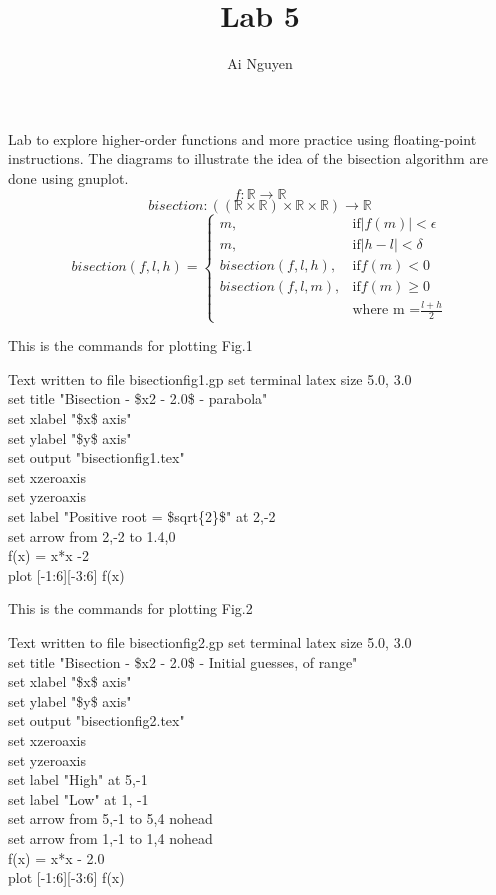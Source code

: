 \documentclass{article}
\begin{document}
\title{Lab 5}
\author{Ai Nguyen}
\maketitle
\clearpage
Lab to explore higher-order functions and more practice using floating-point instructions. The diagrams to illustrate the idea of the bisection algorithm are done using gnuplot. \\
\[ f: \mathbb{R} \rightarrow \mathbb{R} \]
\[ bisection : ((\mathbb{R} \times \mathbb{R}) \times \mathbb{R} \times \mathbb{R}) \rightarrow \mathbb{R}\]
\[ bisection(f,l,h) =
	\begin{cases}
	m, & \text{if} |f(m)| < \epsilon \\
	m, & \text{if} |h-l|  < \delta \\
	bisection (f,l,h), & \text{if} f(m) < 0 \\
	bisection(f,l,m), & \text{if} f(m) \ge 0 \\
	& \text{where m =} \frac{l+h}{2}
	\end{cases}
\]
\begin{multicols}{2}
This is the commands for plotting Fig.1
\begin{GFT}{Text written to file bisectionfig1.gp}
\+set terminal latex size 5.0, 3.0\\
\+set title "Bisection - \$x\Circumflex{}2 - 2.0\$ - parabola"\\
\+set xlabel "\$x\$ axis"\\
\+set ylabel "\$y\$ axis"\\
\+set output "bisectionfig1.tex"\\
\+set xzeroaxis\\
\+set yzeroaxis\\
\+set label "Positive root = \$\Backslash{}sqrt\{2\}\$" at 2,-2\\
\+set arrow from 2,-2 to 1.4,0\\
\+f(x) = x*x -2\\
\+plot [-1:6][-3:6] f(x)\\
\end{GFT}
\columnbreak
This is the commands for plotting Fig.2
\begin{GFT}{Text written to file bisectionfig2.gp}
\+set terminal latex size 5.0, 3.0\\
\+set title "Bisection - \$x\Circumflex{}2 - 2.0\$ - Initial guesses, of range"\\
\+set xlabel "\$x\$ axis"\\
\+set ylabel "\$y\$ axis"\\
\+set output "bisectionfig2.tex"\\
\+set xzeroaxis\\
\+set yzeroaxis\\
\+set label "High" at 5,-1\\
\+set label "Low" at 1, -1\\
\+set arrow from 5,-1 to 5,4 nohead\\
\+set arrow from 1,-1 to 1,4 nohead\\
\+f(x) = x*x - 2.0\\
\+plot [-1:6][-3:6] f(x)\\
\end{GFT}
\end{multicols}
\end{document}
